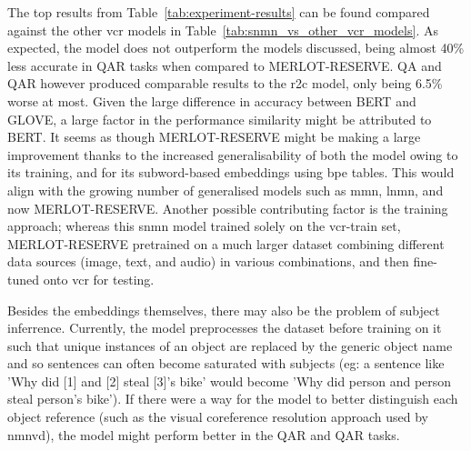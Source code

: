 The top results from Table~\ref{tab:experiment-results} can be found compared against the other \gls{vcr} models in Table~\ref{tab:snmn_vs_other_vcr_models}.
As expected, the model does not outperform the models discussed, being almost 40\% less accurate in Q\rightarrow{}AR tasks when compared to MERLOT-RESERVE.
Q\rightarrow{}A and QA\rightarrow{}R however produced comparable results to the \gls{r2c} model, only being 6.5\% worse at most.
Given the large difference in accuracy between BERT and GLOVE, a large factor in the performance similarity might be attributed to BERT.
It seems as though MERLOT-RESERVE might be making a large improvement thanks to the increased generalisability of both the model owing to its training, and for its subword-based embeddings using \gls{bpe} tables.
This would align with the growing number of generalised models such as \gls{mmn}, \gls{lnmn}, and now MERLOT-RESERVE.
Another possible contributing factor is the training approach; whereas this \gls{snmn} model trained solely on the \gls{vcr}-train set, MERLOT-RESERVE pretrained on a much larger dataset combining different data sources (image, text, and audio) in various combinations, and then fine-tuned onto \gls{vcr} for testing.

Besides the embeddings themselves, there may also be the problem of subject inferrence.
Currently, the model preprocesses the dataset before training on it such that unique instances of an object are replaced by the generic object name and so sentences can often become saturated with subjects (eg: a sentence like 'Why did [1] and [2] steal [3]'s bike' would become 'Why did person and person steal person's bike').
If there were a way for the model to better distinguish each object reference (such as the visual coreference resolution approach used by \gls{nmnvd}\cite{cho_visual_2021}), the model might perform better in the QA\rightarrow{}R and Q\rightarrow{}AR tasks.
